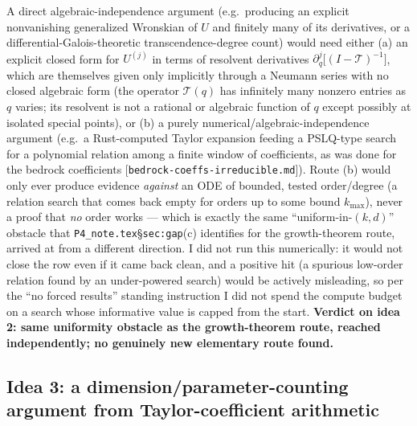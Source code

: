 \documentclass[11pt]{article}
\theoremstyle{remark}
\begin{document}
A direct algebraic-independence argument (e.g.\ producing an explicit nonvanishing generalized
Wronskian of $U$ and finitely many of its derivatives, or a differential-Galois-theoretic
transcendence-degree count) would need either (a) an explicit closed form for $U^{(j)}$ in terms of
resolvent derivatives $\partial_q^j\bigl[(I-\mathcal T)^{-1}\bigr]$, which are themselves given only
implicitly through a Neumann series with no closed algebraic form (the operator $\mathcal T(q)$ has
infinitely many nonzero entries as $q$ varies; its resolvent is not a rational or algebraic function
of $q$ except possibly at isolated special points), or (b) a purely numerical/algebraic-independence
argument (e.g.\ a Rust-computed Taylor expansion feeding a PSLQ-type search for a polynomial relation
among a finite window of coefficients, as was done for the bedrock coefficients
[\texttt{bedrock-coeffs-irreducible.md}]). Route (b) would only ever produce evidence \emph{against}
an ODE of bounded, tested order/degree (a relation search that comes back empty for orders up to some
bound $k_{\max}$), never a proof that \emph{no} order works --- which is exactly the same
``uniform-in-$(k,d)$'' obstacle that \texttt{P4\_note.tex}\S\texttt{sec:gap}(c) identifies for the
growth-theorem route, arrived at from a different direction. I did not run this numerically: it would
not close the row even if it came back clean, and a positive hit (a spurious low-order relation found
by an under-powered search) would be actively misleading, so per the ``no forced results'' standing
instruction I did not spend the compute budget on a search whose informative value is capped from the
start. \textbf{Verdict on idea 2: same uniformity obstacle as the growth-theorem route, reached
independently; no genuinely new elementary route found.}

\subsection{Idea 3: a dimension/parameter-counting argument from Taylor-coefficient arithmetic}
\end{document}
